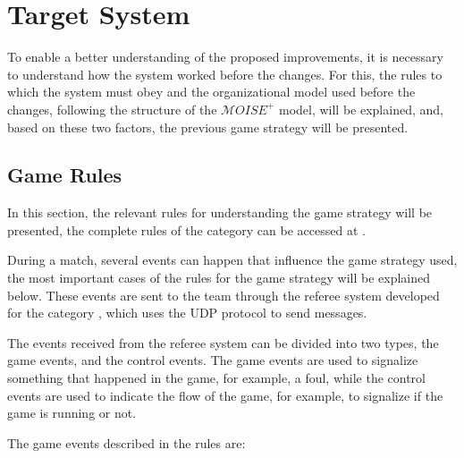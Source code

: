 \def \MOISEp {$\mathcal{M}OISE^+$ }

\chapter{Target System}
\label{ch:target_system}

To enable a better understanding of the proposed improvements, it is necessary to understand how the system worked before the changes. For this, the rules to which the system must obey and the organizational model used before the changes, following the structure of the \MOISEp model, will be explained, and, based on these two factors, the previous game strategy will be presented.

\section{Game Rules}
\label{sec:rules}

In this section, the relevant rules for understanding the game strategy will be presented, the complete rules of the category can be accessed at \cite{RulesVSSS}.

During a match, several events can happen that influence the game strategy used, the most important cases of the rules for the game strategy will be explained below. These events are sent to the team through the referee system developed for the category \cite{VSSReferee}, which uses the UDP protocol to send messages.

The events received from the referee system can be divided into two types, the game events, and the control events. The game events are used to signalize something that happened in the game, for example, a foul, while the control events are used to indicate the flow of the game, for example, to signalize if the game is running or not.

The game events described in the rules are:

